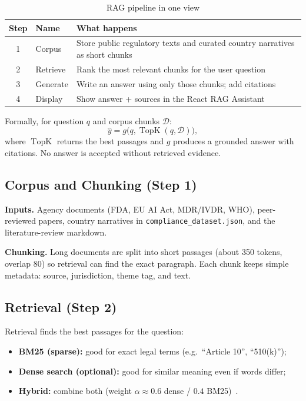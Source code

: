 \begin{table}[htbp]
\centering
\caption{RAG pipeline in one view}
\label{tab:rag-brief}
\begin{tabular}{@{}clp{8.2cm}@{}}
\toprule
\textbf{Step} & \textbf{Name} & \textbf{What happens} \\
\midrule
1 & Corpus & Store public regulatory texts and curated country narratives as short chunks \\
2 & Retrieve & Rank the most relevant chunks for the user question \\
3 & Generate & Write an answer using only those chunks; add citations \\
4 & Display & Show answer + sources in the React RAG Assistant \\
\bottomrule
\end{tabular}
\end{table}

Formally, for question $q$ and corpus chunks $\mathcal{D}$:
\begin{equation}
\label{eq:rag}
\hat{y}=g\bigl(q,\operatorname{TopK}(q,\mathcal{D})\bigr),
\end{equation}
where $\operatorname{TopK}$ returns the best passages and $g$ produces a grounded answer
with citations. No answer is accepted without retrieved evidence.

\subsection{Corpus and Chunking (Step 1)}
\label{sec:rag-corpus}

\textbf{Inputs.}
Agency documents (FDA, EU AI Act, MDR/IVDR, WHO), peer-reviewed papers, country
narratives in \texttt{compliance\_dataset.json}, and the literature-review markdown.

\textbf{Chunking.}
Long documents are split into short passages (about 350 tokens, overlap 80) so retrieval
can find the exact paragraph. Each chunk keeps simple metadata: source, jurisdiction,
theme tag, and text.

\subsection{Retrieval (Step 2)}
\label{sec:rag-retrieve}

Retrieval finds the best passages for the question:
\begin{itemize}[noitemsep]
  \item \textbf{BM25 (sparse):} good for exact legal terms (e.g.\ ``Article 10'', ``510(k)'');
  \item \textbf{Dense search (optional):} good for similar meaning even if words differ;
  \item \textbf{Hybrid:} combine both (weight $\alpha\approx 0.6$ dense / $0.4$ BM25)~\cite{robertson2009,karpukhin2020}.
\end{itemize}

